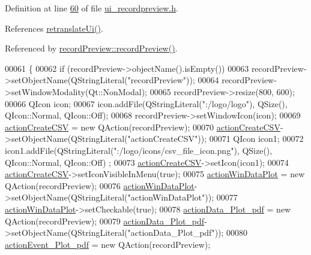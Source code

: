 Definition at line \hyperlink{a00140_source_l00060}{60} of file \hyperlink{a00140_source}{ui\+\_\+recordpreview.\+h}.



References \hyperlink{a00140_source_l00195}{retranslate\+Ui()}.



Referenced by \hyperlink{a00129_source_l00011}{record\+Preview\+::record\+Preview()}.


\begin{DoxyCode}
00061     \{
00062         \textcolor{keywordflow}{if} (recordPreview->objectName().isEmpty())
00063             recordPreview->setObjectName(QStringLiteral(\textcolor{stringliteral}{"recordPreview"}));
00064         recordPreview->setWindowModality(Qt::NonModal);
00065         recordPreview->resize(800, 600);
00066         QIcon icon;
00067         icon.addFile(QStringLiteral(\textcolor{stringliteral}{":/logo/logo"}), QSize(), QIcon::Normal, QIcon::Off);
00068         recordPreview->setWindowIcon(icon);
00069         \hyperlink{a00081_ae81b7303db9e9c5d730c59b86ec0e960}{actionCreateCSV} = \textcolor{keyword}{new} QAction(recordPreview);
00070         \hyperlink{a00081_ae81b7303db9e9c5d730c59b86ec0e960}{actionCreateCSV}->setObjectName(QStringLiteral(\textcolor{stringliteral}{"actionCreateCSV"}));
00071         QIcon icon1;
00072         icon1.addFile(QStringLiteral(\textcolor{stringliteral}{":/logo/icons/csv\_file\_icon.png"}), QSize(), QIcon::Normal, QIcon::Off)
      ;
00073         \hyperlink{a00081_ae81b7303db9e9c5d730c59b86ec0e960}{actionCreateCSV}->setIcon(icon1);
00074         \hyperlink{a00081_ae81b7303db9e9c5d730c59b86ec0e960}{actionCreateCSV}->setIconVisibleInMenu(\textcolor{keyword}{true});
00075         \hyperlink{a00081_aa09067a9c96c9cd78f75261a9fcb89f0}{actionWinDataPlot} = \textcolor{keyword}{new} QAction(recordPreview);
00076         \hyperlink{a00081_aa09067a9c96c9cd78f75261a9fcb89f0}{actionWinDataPlot}->setObjectName(QStringLiteral(\textcolor{stringliteral}{"actionWinDataPlot"}));
00077         \hyperlink{a00081_aa09067a9c96c9cd78f75261a9fcb89f0}{actionWinDataPlot}->setCheckable(\textcolor{keyword}{true});
00078         \hyperlink{a00081_a19203ba5fef3bc68f3d88f1dd3c94777}{actionData\_Plot\_pdf} = \textcolor{keyword}{new} QAction(recordPreview);
00079         \hyperlink{a00081_a19203ba5fef3bc68f3d88f1dd3c94777}{actionData\_Plot\_pdf}->setObjectName(QStringLiteral(\textcolor{stringliteral}{"actionData\_Plot\_pdf"}));
00080         \hyperlink{a00081_a4369770edbf9cb6131a066ca10b3f863}{actionEvent\_Plot\_pdf} = \textcolor{keyword}{new} QAction(recordPreview);

\end{DoxyCode}
